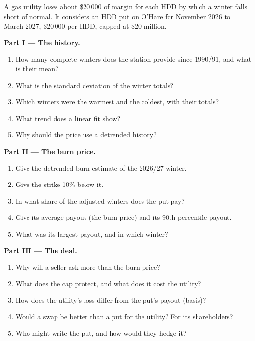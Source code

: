 \begin{problem}\label{pb:m3:freight-weather-and-other-corners:1}
A gas utility loses about \$20\,000 of margin for each HDD by which a winter falls short of normal. It
considers an HDD put on O'Hare for November 2026 to March 2027, \$20\,000 per HDD, capped at \$20 million.

\medskip\noindent\textbf{Part I --- The history.}
\begin{enumerate}
\item How many complete winters does the station provide since 1990/91, and what is their mean?
\item What is the standard deviation of the winter totals?
\item Which winters were the warmest and the coldest, with their totals?
\item What trend does a linear fit show?
\item Why should the price use a detrended history?
\end{enumerate}

\medskip\noindent\textbf{Part II --- The burn price.}
\begin{enumerate}[resume]
\item Give the detrended burn estimate of the 2026/27 winter.
\item Give the strike 10\% below it.
\item In what share of the adjusted winters does the put pay?
\item Give its average payout (the burn price) and its 90th-percentile payout.
\item What was its largest payout, and in which winter?
\end{enumerate}

\medskip\noindent\textbf{Part III --- The deal.}
\begin{enumerate}[resume]
\item Why will a seller ask more than the burn price?
\item What does the cap protect, and what does it cost the utility?
\item How does the utility's loss differ from the put's payout (basis)?
\item Would a swap be better than a put for the utility? For its shareholders?
\item Who might write the put, and how would they hedge it?
\end{enumerate}


\end{problem}
